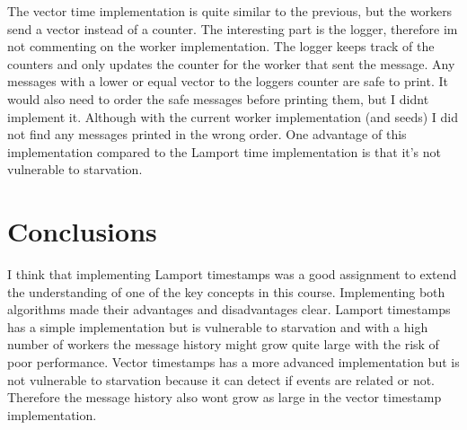 \documentclass[a4paper, 11pt]{article}
\begin{document}
The vector time implementation is quite similar to the previous, but the workers send a vector instead of a counter. The interesting part is the logger, therefore im not commenting on the worker implementation. The logger keeps track of the counters and only updates the counter for the worker that sent the message. Any messages with a lower or equal vector to the loggers counter are safe to print. It would also need to order the safe messages before printing them, but I didnt implement it. Although with the current worker implementation (and seeds) I did not find any messages printed in the wrong order. One advantage of this implementation compared to the Lamport time implementation is that it's not vulnerable to starvation. 

\section{Conclusions}

I think that implementing Lamport timestamps was a good assignment to extend the understanding of one of the key concepts in this course. Implementing both algorithms made their advantages and disadvantages clear. Lamport timestamps has a simple implementation but is vulnerable to starvation and with a high number of workers the message history might grow quite large with the risk of poor performance. Vector timestamps has a more advanced implementation but is not vulnerable to starvation because it can detect if events are related or not. Therefore the message history also wont grow as large in the vector timestamp implementation.
\end{document}
